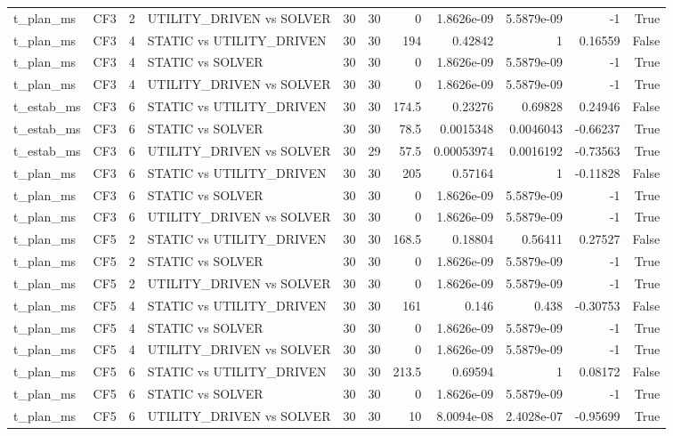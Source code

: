 \begin{tabular}{llrlrrrrrrr}
t_plan_ms & CF3 & 2 & UTILITY_DRIVEN vs SOLVER & 30 & 30 & 0 & 1.8626e-09 & 5.5879e-09 & -1 & True \\
t_plan_ms & CF3 & 4 & STATIC vs UTILITY_DRIVEN & 30 & 30 & 194 & 0.42842 & 1 & 0.16559 & False \\
t_plan_ms & CF3 & 4 & STATIC vs SOLVER & 30 & 30 & 0 & 1.8626e-09 & 5.5879e-09 & -1 & True \\
t_plan_ms & CF3 & 4 & UTILITY_DRIVEN vs SOLVER & 30 & 30 & 0 & 1.8626e-09 & 5.5879e-09 & -1 & True \\
t_estab_ms & CF3 & 6 & STATIC vs UTILITY_DRIVEN & 30 & 30 & 174.5 & 0.23276 & 0.69828 & 0.24946 & False \\
t_estab_ms & CF3 & 6 & STATIC vs SOLVER & 30 & 30 & 78.5 & 0.0015348 & 0.0046043 & -0.66237 & True \\
t_estab_ms & CF3 & 6 & UTILITY_DRIVEN vs SOLVER & 30 & 29 & 57.5 & 0.00053974 & 0.0016192 & -0.73563 & True \\
t_plan_ms & CF3 & 6 & STATIC vs UTILITY_DRIVEN & 30 & 30 & 205 & 0.57164 & 1 & -0.11828 & False \\
t_plan_ms & CF3 & 6 & STATIC vs SOLVER & 30 & 30 & 0 & 1.8626e-09 & 5.5879e-09 & -1 & True \\
t_plan_ms & CF3 & 6 & UTILITY_DRIVEN vs SOLVER & 30 & 30 & 0 & 1.8626e-09 & 5.5879e-09 & -1 & True \\
t_plan_ms & CF5 & 2 & STATIC vs UTILITY_DRIVEN & 30 & 30 & 168.5 & 0.18804 & 0.56411 & 0.27527 & False \\
t_plan_ms & CF5 & 2 & STATIC vs SOLVER & 30 & 30 & 0 & 1.8626e-09 & 5.5879e-09 & -1 & True \\
t_plan_ms & CF5 & 2 & UTILITY_DRIVEN vs SOLVER & 30 & 30 & 0 & 1.8626e-09 & 5.5879e-09 & -1 & True \\
t_plan_ms & CF5 & 4 & STATIC vs UTILITY_DRIVEN & 30 & 30 & 161 & 0.146 & 0.438 & -0.30753 & False \\
t_plan_ms & CF5 & 4 & STATIC vs SOLVER & 30 & 30 & 0 & 1.8626e-09 & 5.5879e-09 & -1 & True \\
t_plan_ms & CF5 & 4 & UTILITY_DRIVEN vs SOLVER & 30 & 30 & 0 & 1.8626e-09 & 5.5879e-09 & -1 & True \\
t_plan_ms & CF5 & 6 & STATIC vs UTILITY_DRIVEN & 30 & 30 & 213.5 & 0.69594 & 1 & 0.08172 & False \\
t_plan_ms & CF5 & 6 & STATIC vs SOLVER & 30 & 30 & 0 & 1.8626e-09 & 5.5879e-09 & -1 & True \\
t_plan_ms & CF5 & 6 & UTILITY_DRIVEN vs SOLVER & 30 & 30 & 10 & 8.0094e-08 & 2.4028e-07 & -0.95699 & True \\

\end{tabular}
